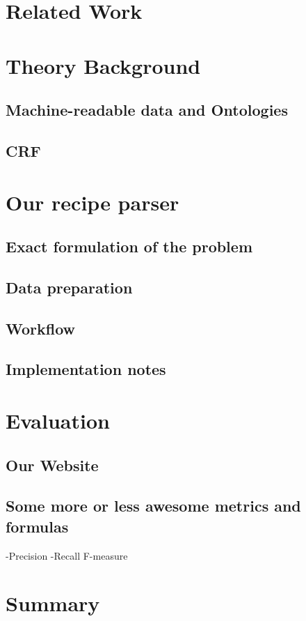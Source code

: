\documentclass[12pt, twoside]{report}
\begin{document}
\chapter{Related Work}


\cite{REgutGenug}

\chapter{Theory Background}
\section{Machine-readable data and Ontologies}
\section{CRF}


\chapter{Our recipe parser}
\section{Exact formulation of the problem}
\section{Data preparation}
\section{Workflow}
\section{Implementation notes}

\chapter{Evaluation}
\section{Our Website}
\section{Some more or less awesome metrics and formulas}
-Precision -Recall F-measure


\chapter{Summary}
\end{document}
